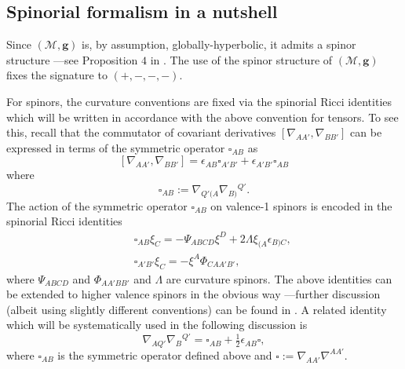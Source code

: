 \documentclass[10pt,a4paper]{article}
\theoremstyle{plain}
\def\bmg{{\bm g}}
\begin{document}
\subsection{Spinorial formalism in a nutshell}
\label{NotationAndSpinorFormalism}

Since $(\mathcal{M}, \bmg)$ is, by assumption, globally-hyperbolic, it
admits a spinor structure ---see Proposition $4$ in
\cite{CFEbook}. The use of the spinor structure of $(\mathcal{M},
\bmg)$ fixes the signature to $(+, -, -, -)$.

\medskip

For spinors, the curvature conventions are fixed via the spinorial
Ricci identities which will be written in accordance with the above
convention for tensors.  To see this, recall that the commutator of
covariant derivatives $[ \nabla_{AA'},\nabla_{BB'}]$ can be expressed
in terms of the symmetric operator $\square_{AB}$ as
\[
[ \nabla_{AA'},\nabla_{BB'}]= \epsilon_{AB}\square_{A'B'} +
\epsilon_{A'B'}\square_{AB}
\]
where
\[
\square_{AB} := \nabla_{Q'(A} \nabla_{B)}{}^{Q'}.
\]
 The action of the symmetric operator $\square_{AB}$ on valence-1
 spinors is encoded in the spinorial Ricci identities
\begin{subequations}
\begin{eqnarray}
&& \square_{AB}\xi_{C}=-\Psi_{ABCD} \xi^{D} +
  2\Lambda\xi_{(A}\epsilon_{B)C},
 \label{SpinorialRicciIdentities1} \\
&& \square_{A'B'}\xi_{C}=-\xi^{A}\Phi_{CA A' B'},
\label{SpinorialRicciIdentities2}
\end{eqnarray}
\end{subequations}
where $\Psi_{ABCD}$ and $\Phi_{AA'BB'}$ and $\Lambda$ are curvature
spinors.  The above identities can be extended to higher valence
spinors in the obvious way ---further discussion (albeit using
slightly different conventions) can be found in \cite{Ste91}. A
related identity which will be systematically used in the following
discussion is
\begin{equation}\label{DecomposeDoubleDerivativeContracted}
\nabla_{AQ'}\nabla_{B}{}^{Q'}=\square_{AB}+
\tfrac{1}{2}\epsilon_{AB}\square,
\end{equation}
where $\square_{AB}$ is the symmetric operator defined above and
$\square := \nabla_{AA'}\nabla^{AA'}.$
\medskip 
\end{document}
